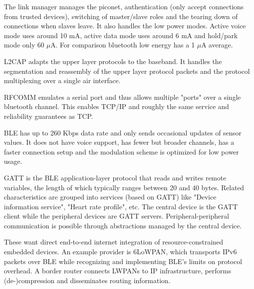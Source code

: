 \begin{mytitle} The link manager manages the piconet, authentication (only accept connections from trusted devices), switching of master/slave roles and the tearing down of connections when slaves leave. It also handles the low power modes. Active voice mode uses around 10 mA, active data mode uses around 6 mA and hold/park mode only 60 $\mu$A. For comparison bluetooth low energy has a 1 $\mu$A average.
\end{mytitle}
\begin{mytitle} L2CAP adapts the upper layer protocols to the baseband. It handles the segmentation and reassembly of the upper layer protocol packets and the protocol multiplexing over a single air interface.
\end{mytitle}
\begin{mytitle} RFCOMM emulates a serial port and thus allows multiple "ports" over a single bluetooth channel. This enables TCP/IP and roughly the same service and reliability guarantees as TCP.
\end{mytitle}
\begin{mytitle} BLE has up to 260 Kbps data rate and only sends occasional updates of sensor values. It does not have voice support, has fewer but broader channels, has a faster connection setup and the modulation scheme is optimized for low power usage.
\end{mytitle}
\begin{mytitle} GATT is the BLE application-layer protocol that reads and writes remote variables, the length of which typically ranges between 20 and 40 bytes. Related characteristics are grouped into services (based on GATT) like "Device information service", "Heart rate profile", etc. The central device is the GATT client while the peripheral devices are GATT servers. Peripheral-peripheral communication is possible through abstractions managed by the central device.
\end{mytitle}
\begin{mytitle} These want direct end-to-end internet integration of resource-constrained embedded devices. An example provider is 6LoWPAN, which transports IPv6 packets over BLE while recognizing and implementing BLE's limits on protocol overhead. A border router connects LWPANs to IP infrastructure, performs (de-)compression and disseminates routing information.
\end{mytitle}

